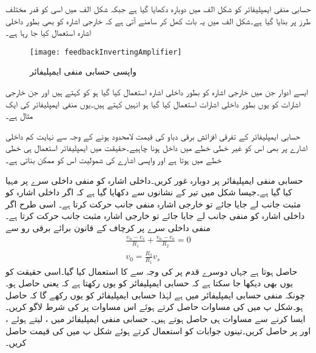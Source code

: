 حسابی منفی ایمپلیفائر کو شکل  الف میں دوبارہ دکھایا گیا ہے جبکہ شکل  الف     میں اسی کو قدر مختلف طرز پر بنایا گیا ہے۔شکل  الف     میں یہ بات کھل کر سامنے آتی ہے کہ خارجی اشارہ  کو بھی بطور داخلی اشارہ استعمال کیا جا رہا ہے۔
\begin{figure}
\centering
\texttt{[image: feedbackInvertingAmplifier]}
\caption{واپسی حسابی منفی ایمپلیفائر}
\label{شکل_حسابی_واپسی_منفی_ایمپلیفائر}
\end{figure}

ایسے ادوار جن میں خارجی اشارہ کو بطور داخلی اشارہ استعمال کیا گیا ہو کو  کہتے ہیں اور جن خارجی  اشارات کو یوں بطور داخلی اشارات استعمال کیا گیا ہو انہیں   کہتے ہیں۔یوں منفی ایمپلیفائر  کی ایک مثال ہے۔

حسابی ایمپلیفائر کے تفرقی افزائش برقی دباو   کی قیمت لامحدود ہونے کے وجہ سے نہایت کم داخلی اشارے پر بھی اس کو غیر خطی خطے میں داخل ہونا چاہیے۔حقیقت میں ایمپلیفائر استعمال ہی خطی خطے میں ہوتا ہے اور واپسی اشارے کی شمولیت اس کو ممکن بناتی ہے۔

حسابی منفی ایمپلیفائر پر دوبارہ غور کریں۔داخلی اشارہ  کو منفی داخلی سرے پر مہیا کیا گیا ہے۔جیسا شکل میں تیر کے نشانوں سے دکھایا گیا ہے کہ اگر داخلی اشارہ  کو مثبت جانب  لے جایا جائے تو خارجی اشارہ  منفی جانب  حرکت کرتا ہے۔ اسی طرح اگر داخلی اشارہ  کو منفی جانب  لے جایا جائے تو خارجی اشارہ  مثبت جانب  حرکت کرتا ہے۔منفی داخلی سرے  پر کرچاف کے قانون برائے برقی رو سے 
\begin{align}\label{مساوات_حسابی_واپسی_منفی}
\frac{v_n-v_s}{R_1}+\frac{v_n-v_o}{R_2}=0\\
v_0=\frac{R_2}{R_1} v_s
\end{align}
حاصل ہوتا ہے جہاں  دوسرے قدم پر  کی وجہ سے  کا استعمال کیا گیا۔اسی حقیقت کو یوں بھی دیکھا جا سکتا ہے کہ حسابی ایمپلیفائر  کو یوں رکھتا ہے کہ  یعنی   حاصل ہو۔چونکہ منفی حسابی ایمپلیفائر میں  ہے لہٰذا حسابی ایمپلیفائر  کو یوں رکھے گا کہ  حاصل ہو۔شکل  پ میں  کی مساوات حاصل کرتے ہوئے  اس مساوات پر  کی شرط لاگو کریں۔ایسا کرنے سے مساوات  ہی حاصل ہوتے ہیں۔
حسابی منفی ایمپلیفائر میں ،  لیتے ہوئے ،   اور   پر  حاصل کریں۔تینوں جوابات کو استعمال کرتے ہوئے شکل  پ میں  کی قیمت حاصل کریں۔


